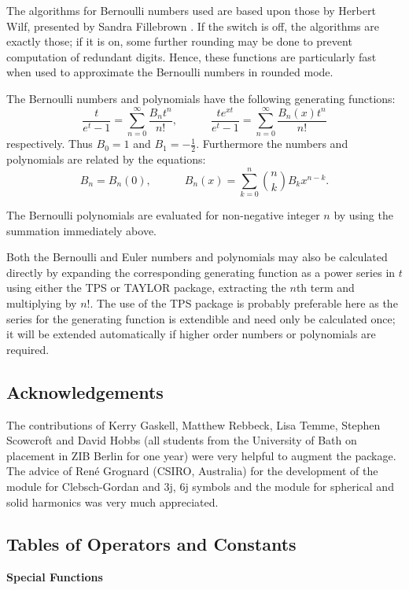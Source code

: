 The algorithms for Bernoulli numbers used are based upon those by Herbert Wilf,
presented by Sandra Fillebrown \cite{Fillebrown:92}.  
If the  switch is off,
the algorithms are exactly those; if it is on, some further rounding may
be done to prevent computation of redundant digits.  Hence, these
functions are particularly fast when used to approximate the Bernoulli
numbers in rounded mode.

The Bernoulli numbers and polynomials have the following generating functions:
$$ \frac {t} {e^t-1} = \sum_{n=0}^{\infty}\frac{B_nt^n}{n!},\qquad\quad
\frac {te^{x t}} {e^t -1} = \sum_{n=0}^{\infty}\frac{B_n(x)t^n}{n!}$$
respectively. Thus $B_0=1$ and $B_1=-\frac{1}{2}$. Furthermore the numbers and
polynomials are related by the equations:
$$ B_n= B_n(0),\qquad\quad  B_n(x) = \sum_{k=0}^n \binom{n}{k} B_kx^{n-k}.$$

The Bernoulli polynomials are evaluated for non-negative integer $n$ by using
the summation immediately above.

Both the Bernoulli and Euler numbers and polynomials may also be calculated
directly by expanding the corresponding generating function as a power
series in $t$ using either the TPS or TAYLOR package, extracting the $n$th term
and multiplying by $n!$. The use of the TPS package is probably preferable here
as the series for the generating function is extendible and need only be
calculated once; it will be extended automatically if higher order numbers or
polynomials are required.

\subsection{Acknowledgements}

The contributions of Kerry Gaskell, Matthew Rebbeck, Lisa Temme,
Stephen Scowcroft and David Hobbs (all students from the University of Bath
on placement in ZIB Berlin for one year) were very helpful
to augment the package. The advice of Ren\'e Grognard (CSIRO, Australia)
for the development of the module for Clebsch-Gordan and 3j, 6j symbols
and the module for spherical and solid harmonics was very much appreciated.
\newpage

\subsection{Tables of Operators and Constants}
\hypertarget{SPECFNTAB1}{}

\textbf{Special Functions}

